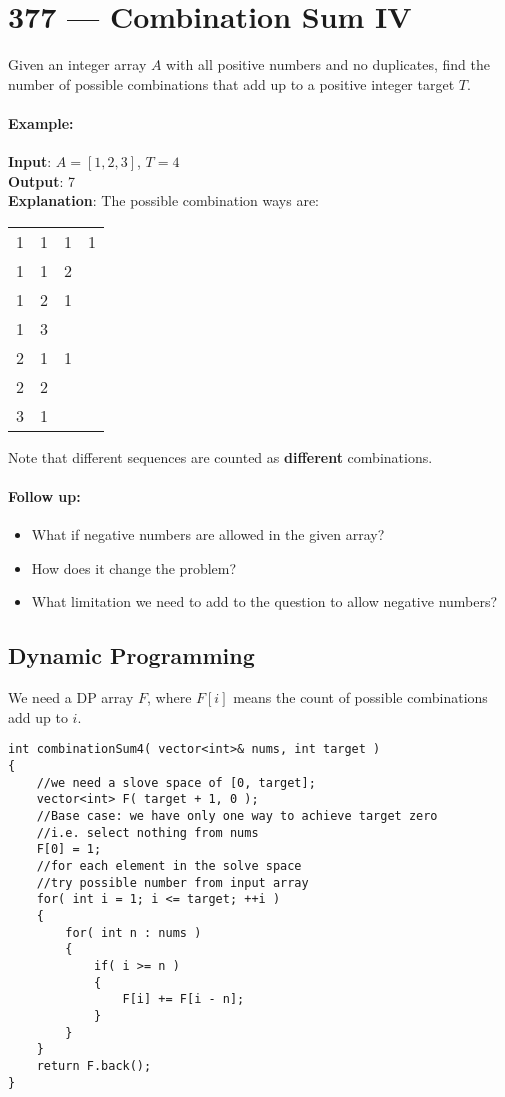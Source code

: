 \section{377 --- Combination Sum IV}
Given an integer array $A$ with all positive numbers and no duplicates, find the number of possible combinations that add up to a positive integer target $T$.

\paragraph{Example:}

\begin{flushleft}
\textbf{Input}: $A = [1, 2, 3]$, $T = 4$
\\
\textbf{Output}: 7
\\
\textbf{Explanation}: The possible combination ways are:
\begin{table}[H]
\begin{tabular}{llll}
1 & 1 & 1 & 1\\
1 & 1 & 2 & \\
1 & 2 & 1  & \\
1 & 3  &  & \\
2 & 1 & 1 & \\
2 & 2 &  & \\
3 & 1 &  & 
\end{tabular}
\end{table}
Note that different sequences are counted as \textbf{different} combinations.
\end{flushleft}

\paragraph{Follow up:}
\begin{itemize}
\item What if negative numbers are allowed in the given array?
\item How does it change the problem?
\item What limitation we need to add to the question to allow negative numbers?
\end{itemize}

\subsection{Dynamic Programming}
We need a DP array $F$, where $F[i]$ means the count of possible combinations add up to $i$.

\setcounter{lstlisting}{0}
\begin{lstlisting}[style=customc, caption={DP}]
int combinationSum4( vector<int>& nums, int target )
{
    //we need a slove space of [0, target];
    vector<int> F( target + 1, 0 );
    //Base case: we have only one way to achieve target zero
    //i.e. select nothing from nums
    F[0] = 1;
    //for each element in the solve space
    //try possible number from input array
    for( int i = 1; i <= target; ++i )
    {
        for( int n : nums )
        {
            if( i >= n )
            {
                F[i] += F[i - n];
            }
        }
    }
    return F.back();
}
\end{lstlisting}

